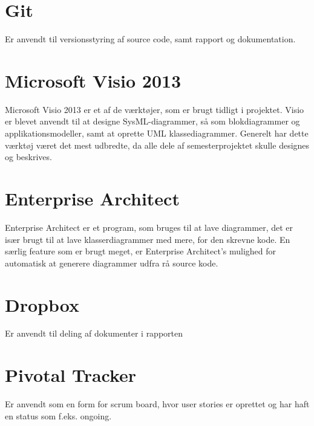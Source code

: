 \section*{Git}
Er anvendt til versionsstyring af source code, samt rapport og dokumentation.

\section*{Microsoft Visio 2013}
Microsoft Visio 2013 er et af de værktøjer, som er brugt tidligt i projektet. Visio er blevet anvendt til at designe SysML-diagrammer, så som blokdiagrammer og applikationsmodeller, samt at oprette UML klassediagrammer. Generelt har dette værktøj været det mest udbredte, da alle dele af semesterprojektet skulle designes og beskrives.

\section*{Enterprise Architect}
Enterprise Architect er et program, som bruges til at lave diagrammer, det er især brugt til at lave klasserdiagrammer med mere, for den skrevne kode. En særlig feature som er brugt meget, er Enterprise Architect's mulighed for automatisk at generere diagrammer udfra rå source kode.

\section*{Dropbox}
Er anvendt til deling af dokumenter i rapporten

\section*{Pivotal Tracker}
Er anvendt som en form for scrum board, hvor user stories er oprettet og har haft en status som f.eks. ongoing. 
